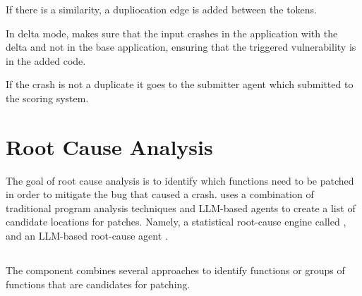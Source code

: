 If there is a similarity, a dupliocation edge is added between the tokens.

In delta mode, \povguy makes sure that the input crashes in the application with the delta and not in the base application, ensuring that the triggered vulnerability is in the added code.

If the crash is not a duplicate it goes to the submitter agent which submitted to the scoring system.

\section{Root Cause Analysis}
\label{rootcause}

The goal of root cause analysis is to identify which functions need to be patched in order to mitigate the bug that caused a crash.
\artiphishell{} uses a combination of traditional program analysis techniques and LLM-based agents to create a list of candidate locations for patches. Namely, a statistical root-cause engine called \kumushi{}, and an LLM-based root-cause agent \dyva{}.


\subsection{\kumushi}
\label{kumushi}

The \kumushi component combines several approaches to identify functions or groups of functions that are candidates for patching.

